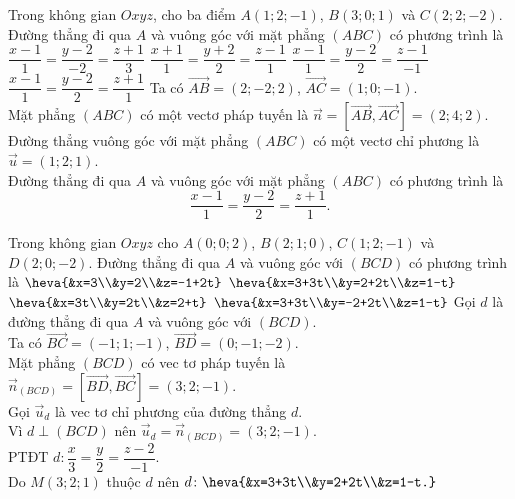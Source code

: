 \begin{ex}%
	Trong không gian $Oxyz$, cho ba điểm $A(1;2;-1)$, $B(3;0;1)$ và $C(2;2;-2)$. Đường thẳng đi qua $A$ và vuông góc với mặt phẳng $(ABC)$ có phương trình là
	\choice
	{$\dfrac{x-1}{1}=\dfrac{y-2}{-2}=\dfrac{z+1}{3}$}
	{$\dfrac{x+1}{1}=\dfrac{y+2}{2}=\dfrac{z-1}{1}$}
	{$\dfrac{x-1}{1}=\dfrac{y-2}{2}=\dfrac{z-1}{-1}$}
	{\True $\dfrac{x-1}{1}=\dfrac{y-2}{2}=\dfrac{z+1}{1}$}
	\loigiai
	{Ta có $\overrightarrow{AB}=(2;-2;2)$, $\overrightarrow{AC}=(1;0;-1)$.\\
		Mặt phẳng $(ABC)$ có một vectơ pháp tuyến là $\vec{n}=\left[\overrightarrow{AB},\overrightarrow{AC}\right]=(2;4;2)$.\\
		Đường thẳng vuông góc với mặt phẳng $(ABC)$ có một vectơ chỉ phương là $\vec{u}=(1;2;1)$.\\
		Đường thẳng đi qua $A$ và vuông góc với mặt phẳng $(ABC)$ có phương trình là
		\[\dfrac{x-1}{1}=\dfrac{y-2}{2}=\dfrac{z+1}{1}.\]
	}
\end{ex}
\begin{ex}%
	Trong không gian $Oxyz$ cho $A(0;0;2)$, $B(2;1;0)$, $C(1;2;-1)$ và $D(2;0;-2)$. Đường thẳng đi qua $A$ và vuông góc với $(BCD)$ có phương trình là
	\choice
	{$\heva{&x=3\\&y=2\\&z=-1+2t}$}
	{\True $\heva{&x=3+3t\\&y=2+2t\\&z=1-t}$}
	{$\heva{&x=3t\\&y=2t\\&z=2+t}$}
	{$\heva{&x=3+3t\\&y=-2+2t\\&z=1-t}$}
	\loigiai
	{
		Gọi $d$ là đường thẳng đi qua $A$ và vuông góc với $(BCD)$.\\
		Ta có $\overrightarrow{BC}=(-1;1;-1)$, $\overrightarrow{BD}=(0;-1;-2)$.\\
		Mặt phẳng $(BCD)$ có vec tơ pháp tuyến là $\vec{n}_{(BCD)}=\left[\overrightarrow{BD},\overrightarrow{BC}\right]=(3;2;-1)$.\\
		Gọi $\vec{u}_{d}$ là vec tơ chỉ phương của đường thẳng $d$.\\
		Vì $d\perp(BCD)$ nên $\overrightarrow{u}_{d}=\vec{n}_{(BCD)}=(3;2;-1)$.\\
		PTĐT $d\colon\dfrac{x}{3}=\dfrac{y}{2}=\dfrac{z-2}{-1}$.\\
		Do $M(3;2;1)$ thuộc $d$ nên $d\colon\heva{&x=3+3t\\&y=2+2t\\&z=1-t.}$
	}
\end{ex}
